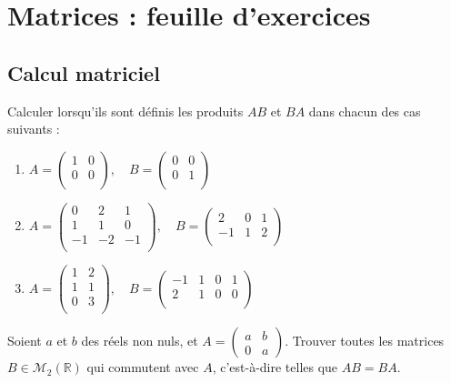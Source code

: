 \documentclass{book}
\begin{document}
\chapter*{Matrices : feuille d'exercices}


\section{Calcul matriciel} 
\begin{Exercice}
Calculer lorsqu'ils sont définis les produits $AB$ et $BA$ dans chacun des cas suivants :
\begin{enumerate}
\item $\displaystyle A= \left(\begin{array}{cc}
1  &  0  \\
0  &  0 \\
\end{array}\right),\quad 
B=\left(\begin{array}{cc}
0  &  0  \\
0  &  1 \\
\end{array}\right)
$
\item $\displaystyle A=\left(\begin{array}{ccc}
0 & 2 & 1\\
1 & 1 & 0\\
-1&-2 &-1\\
\end{array}\right),\quad
B=\left(\begin{array}{ccc}
2 & 0 & 1\\
-1& 1 & 2\\
\end{array}\right)
$
\item $\displaystyle A=\left(\begin{array}{cc}
1 & 2 \\
1 & 1 \\
0 & 3 \\
\end{array}\right),
\quad B=\left(\begin{array}{cccc}
-1 & 1 & 0& 1 \\
2 & 1 & 0& 0 \\
\end{array}\right)
$
\end{enumerate}
\end{Exercice}
\begin{Exercice}[Commutant]
Soient $a$ et $b$ des réels non nuls, et $A=\left( \begin{array}{cc} a & b\\ 
 0 &a \end{array} \right).$ Trouver toutes les matrices $B\in\mathcal M_2(\mathbb R)$ qui commutent avec $A$,
c'est-à-dire telles que $AB=BA$.

\end{Exercice}
\end{document}

